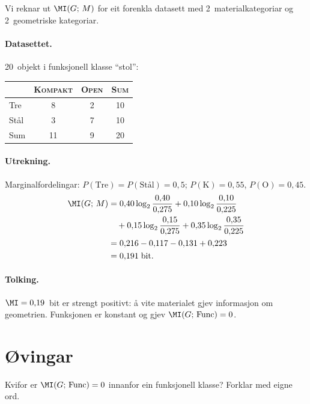 Vi reknar ut $\MI(G;\, M)$ for eit forenkla datasett med
2~materialkategoriar og 2~geometriske kategoriar.

\paragraph{Datasettet.}
20~objekt i funksjonell klasse ``stol'':

\medskip
\begin{center}
{\footnotesize
\begin{tabular}{@{}lcc|c@{}}
\toprule
& \textsc{Kompakt} & \textsc{Open} & \textsc{Sum} \\
\midrule
Tre & 8 & 2 & 10 \\
Stål & 3 & 7 & 10 \\
\midrule
Sum & 11 & 9 & 20 \\
\bottomrule
\end{tabular}
}
\end{center}

\paragraph{Utrekning.}
Marginalfordelingar: $P(\text{Tre}) = P(\text{Stål}) = 0{,}5$;
$P(\text{K}) = 0{,}55$, $P(\text{O}) = 0{,}45$.
\begin{align*}
  \MI(G;\, M)
  &= 0{,}40 \log_2 \frac{0{,}40}{0{,}275}
   + 0{,}10 \log_2 \frac{0{,}10}{0{,}225} \\
  &\quad + 0{,}15 \log_2 \frac{0{,}15}{0{,}275}
   + 0{,}35 \log_2 \frac{0{,}35}{0{,}225} \\
  &= 0{,}216 - 0{,}117 - 0{,}131 + 0{,}223 \\
  &= 0{,}191 \;\text{bit}.
\end{align*}

\paragraph{Tolking.}
$\MI = 0{,}19$~bit er strengt positivt: å vite materialet gjev
informasjon om geometrien. Funksjonen er konstant og gjev
$\MI(G;\, \mathrm{Func}) = 0$.


\section{Øvingar}

\begin{exercise}[Nivå 1]\label{ex:7.1}
Kvifor er $\MI(G;\, \mathrm{Func}) = 0$ innanfor ein funksjonell
klasse? Forklar med eigne ord.
\end{exercise}

